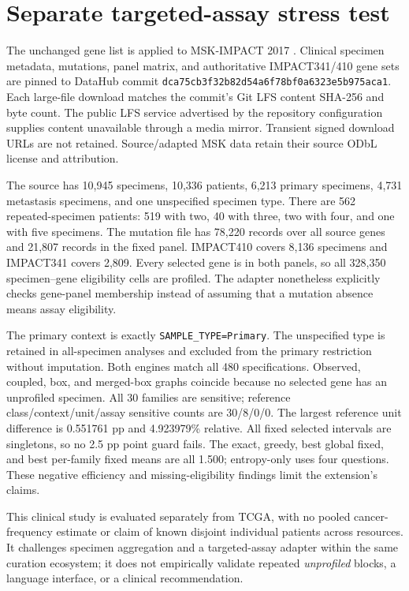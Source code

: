 \documentclass[10pt,letterpaper]{article}
\begin{document}
\section{Separate targeted-assay stress test}
The unchanged gene list is applied to MSK-IMPACT 2017 \cite{zehir}. Clinical specimen metadata, mutations, panel matrix, and authoritative IMPACT341/410 gene sets are pinned to DataHub commit \texttt{dca75cb3f32b82d54a6f78bf0a6323e5b}\allowbreak\texttt{975aca1}. Each large-file download matches the commit's Git LFS content SHA-256 and byte count. The public LFS service advertised by the repository configuration supplies content unavailable through a media mirror. Transient signed download URLs are not retained. Source/adapted MSK data retain their source ODbL license and attribution.

The source has 10,945 specimens, 10,336 patients, 6,213 primary specimens, 4,731 metastasis specimens, and one unspecified specimen type. There are 562 repeated-specimen patients: 519 with two, 40 with three, two with four, and one with five specimens. The mutation file has 78,220 records over all source genes and 21,807 records in the fixed panel. IMPACT410 covers 8,136 specimens and IMPACT341 covers 2,809. Every selected gene is in both panels, so all 328,350 specimen--gene eligibility cells are profiled. The adapter nonetheless explicitly checks gene-panel membership instead of assuming that a mutation absence means assay eligibility.

The primary context is exactly \texttt{SAMPLE\_TYPE=Primary}. The unspecified type is retained in all-specimen analyses and excluded from the primary restriction without imputation. Both engines match all 480 specifications. Observed, coupled, box, and merged-box graphs coincide because no selected gene has an unprofiled specimen. All 30 families are sensitive; reference class/context/unit/assay sensitive counts are 30/8/0/0. The largest reference unit difference is 0.551761 pp and 4.923979\% relative. All fixed selected intervals are singletons, so no 2.5 pp point guard fails. The exact, greedy, best global fixed, and best per-family fixed means are all 1.500; entropy-only uses four questions. These negative efficiency and missing-eligibility findings limit the extension's claims.

\begin{center}\small\end{center}

This clinical study is evaluated separately from TCGA, with no pooled cancer-frequency estimate or claim of known disjoint individual patients across resources. It challenges specimen aggregation and a targeted-assay adapter within the same curation ecosystem; it does not empirically validate repeated \emph{unprofiled} blocks, a language interface, or a clinical recommendation.
\end{document}
